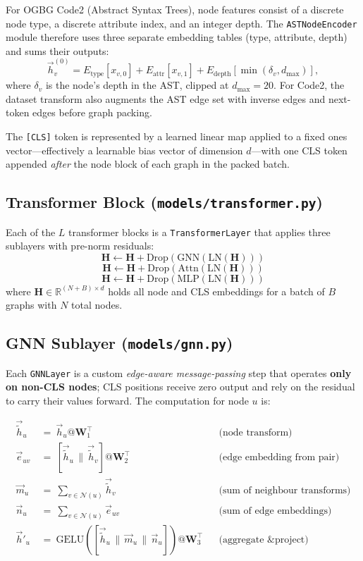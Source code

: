 \documentclass[11pt]{article}
\begin{document}
For \textsf{OGBG Code2} (Abstract Syntax Trees), node features consist of a discrete node type, a discrete attribute index, and an integer depth. The \texttt{ASTNodeEncoder} module therefore uses three separate embedding tables (type, attribute, depth) and sums their outputs:
\[
\vec{h}^{(0)}_v
  = E_\text{type}[x_{v,0}]
  + E_\text{attr}[x_{v,1}]
  + E_\text{depth}[\min(\delta_v, d_\text{max})],
\]
where $\delta_v$ is the node's depth in the AST, clipped at $d_\text{max}=20$.
For Code2, the dataset transform also augments the AST edge set with inverse edges and next-token edges before graph packing.

The \texttt{[CLS]} token is represented by a learned linear map applied to a fixed ones vector---effectively a learnable bias vector of dimension $d$---with one CLS token appended \emph{after} the node block of each graph in the packed batch.

\subsection{Transformer Block (\texttt{models/transformer.py})}

Each of the $L$ transformer blocks is a \texttt{TransformerLayer} that applies three sublayers with pre-norm residuals:
\[
\mathbf{H} \leftarrow \mathbf{H} + \mathrm{Drop}\!\left(\mathrm{GNN}(\mathrm{LN}(\mathbf{H}))\right)
\]
\[
\mathbf{H} \leftarrow \mathbf{H} + \mathrm{Drop}\!\left(\mathrm{Attn}(\mathrm{LN}(\mathbf{H}))\right)
\]
\[
\mathbf{H} \leftarrow \mathbf{H} + \mathrm{Drop}\!\left(\mathrm{MLP}(\mathrm{LN}(\mathbf{H}))\right)
\]
where $\mathbf{H} \in \mathbb{R}^{(N+B)\times d}$ holds all node and CLS embeddings for a batch of $B$ graphs with $N$ total nodes.

\subsection{GNN Sublayer (\texttt{models/gnn.py})}

Each \texttt{GNNLayer} is a custom \emph{edge-aware message-passing} step that operates \textbf{only on non-CLS nodes}; CLS positions receive zero output and rely on the residual to carry their values forward. The computation for node $u$ is:

\begin{align*}
\vec{\tilde{h}}_u\ &=\ \vec{h}_u @ \mathbf{W}_1^\top & &\text{(node transform)} \\
\vec{e}_{uv}\ &=\ [\vec{\tilde{h}}_u \,\|\, \vec{\tilde{h}}_v] @ \mathbf{W}_2^\top & &\text{(edge embedding from pair)} \\
\vec{m}_u\ &=\ \textstyle\sum_{v\in\mathcal{N}(u)} \vec{\tilde{h}}_v & &\text{(sum of neighbour transforms)} \\
\vec{n}_u\ &=\ \textstyle\sum_{v\in\mathcal{N}(u)} \vec{e}_{uv} & &\text{(sum of edge embeddings)} \\
\vec{h}'_u\ &=\ \mathrm{GELU}\!\left([\vec{\tilde{h}}_u \,\|\, \vec{m}_u \,\|\, \vec{n}_u]\right) @ \mathbf{W}_3^\top & &\text{(aggregate \& project)}
\end{align*}
\end{document}
